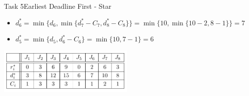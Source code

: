 \begin{frame}[allowframebreaks]{Task 5}{Earliest Deadline First - Star\vspace{0.5cm}}
\begin{itemize}
        \item $d_6^* = \min\{d_6, \min\{d_7^* - C_7, d_8^* - C_8\}\} = \min\{10, \min\{10-2, 8-1\}\} = 7$
        \item $d_5^* = \min\{d_5, d_6^* - C_6\} = \min\{10, 7 - 1\} = 6$
    \end{itemize}
  \framebreak
  \begin{solution}
    \centering
    \includegraphics[width=0.5\textwidth]{./figures/5_table_sol.png}
  \end{solution}
\end{frame}

